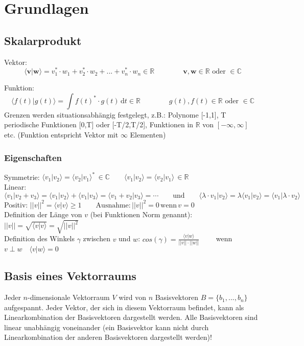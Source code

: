 \section{Grundlagen}

\subsection{Skalarprodukt }

Vektor:
\[
	\langle \mathbf{v}|\mathbf{w}\rangle = v_1^* \cdot w_1 + v_2^* \cdot w_2 + ... + v_n^* \cdot w_n  \in \mathbb{R} \qquad \qquad \mathbf{v},\mathbf{ w} \in \mathbb{R} \text{ oder } \in \mathbb{C} 
\]

Funktion:
\[  
	\langle f(t)|g(t) \rangle =  \int f(t)^*\cdot g(t) \,\mathrm{d}t \in \mathbb{R} \qquad \qquad g(t), f(t) \in \mathbb{R} \text{ oder } \in \mathbb{C}
\]
Grenzen werden situationsabhängig festgelegt, z.B.: Polynome [-1,1], T periodische Funktionen [0,T] oder [-T/2,T/2], Funktionen in $\mathbb{R}$ von $[-\infty,\infty]$ etc. (Funktion entspricht Vektor mit $\infty$ Elementen)

\subsubsection{Eigenschaften}
Symmetrie: $\langle v_1|v_2 \rangle = \langle v_2|v_1 \rangle^* \, \in \mathbb{C}  \qquad \langle v_1|v_2 \rangle = \langle v_2|v_1 \rangle \, \in \mathbb{R}$ \\
Linear: $\langle v_1|v_2 + v_3 \rangle = \langle v_1|v_2 \rangle + \langle v_1|v_3 \rangle =\langle v_1 + v_2|v_3 \rangle = \cdots  \qquad \text{und}\qquad \langle \lambda \cdot v_1|v_2 \rangle = \lambda \langle v_1|v_2 \rangle = \langle v_1|\lambda \cdot v_2 \rangle$\\
Positiv: $||v||^2 = \langle v|v \rangle \geq 1 \qquad \text{Ausnahme:} \, ||v||^2=0 \, \text{wenn} \, v=0$\\
Definition der Länge von $v$ (bei Funktionen Norm genannt): $||v|| = \sqrt{\langle v|v \rangle} = \sqrt{||v||^2}$\\
Definition des Winkels $\gamma$ zwischen $v$ und $w$: $cos(\gamma) = \frac{\langle v|w \rangle}{||v||\cdot ||w||} \qquad$ wenn $v \perp w  \quad \langle v|w \rangle = 0$


\subsection{Basis eines Vektorraums }
Jeder $n$-dimensionale Vektorraum $V$ wird von $n$ Basisvektoren $B=\{ b_1,...,b_n \}$ aufgespannt. Jeder Vektor, der sich in diesem Vektorraum befindet, kann als Linearkombination der Basisvektoren dargestellt werden.  Alle Basisvektoren sind linear unabhängig voneinander (ein Basisvektor kann nicht durch Linearkombination der anderen Basisvektoren dargestellt werden)!

